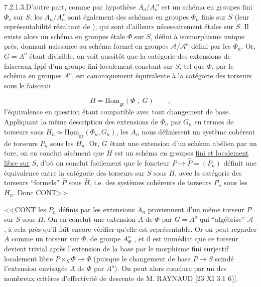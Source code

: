 7.2.1.3.\quad D'autre part, comme par hypothèse $A_{o}/A_{o}^{\;o}$ est un schéma en groupes fini $\Phi_{o}$ sur $S$, les $A_{n}/A_{n}^{\;o}$ sont également des schémas en groupes $\Phi_{n}$ finis sur $S$ (leur représentabilité résultant de \hspace{3cm}), qui sont d'ailleurs nécessairement étales sur $S$. Il existe alors un schéma en groupes étale $\Phi$ sur $S$, défini à isomorphisme unique près, donnant naissance au schéma formel en groupes $\mathcal{A}/\mathcal{A}^{o}$ défini par les $\Phi_{n}$. Or, $G = A^{o}$ étant divisible, on voit aussitôt que la catégorie des extensions de faisceaux fppf d'un groupe fini localement constant sur $S$, tel que $\Phi$, par le schéma en groupes $A^{o}$, est canoniquement équivalente à la catégorie des torseurs sous le faisceau

\begin{equation*}
H = \underline{\mathrm{Hom}}_{\mathrm{gr}}(\Phi \; , \; G) \qquad ,
\end{equation*}
l'équivalence en question étant compatible avec tout changement de base. Appliquant la même description des extensions de $\Phi_{n}$ par $G_{n}$ en termes de torseurs sous $H_{n} \simeq \underline{\mathrm{Hom}}_{\mathrm{gr}}(\Phi_{n},G_{n})$, les $A_{n}$ nous définissent un système cohérent de torseurs $P_{n}$ sous les $H_{n}$. Or, $G$ étant une extension d'un schéma abélien par un tore, on en conclut aisément que $H$ est un schéma en groupes \underline{fini et localement libre sur} $S$, d'où on conclut facilement que le foncteur $P \longmapsto \hat{P} = (P_{n})$ définit une équivalence entre la catégorie des torseurs sur $S$ sous $H$, avec la catégorie des torseurs ``formels'' $\hat{P}$ sous $\hat{H}$, i.e. des systèmes cohérents de torseurs $P_{n}$ sous les $H_{n}$. Donc CONT>>



<<CONT les $P_{n}$ définis par les extensions $A_{n}$ proviennent d'un même torseur $P$ sur $S$ sous $H$. On en conclut une extension $A$ de $\Phi$ par $G = A^{o}$ qui ``algébrise'' $\mathcal{A}$ , à cela près qu'il fait encore vérifier qu'elle est représentable. Or on peut regarder $A$ comme un torseur sur $\Phi$, de groupe $A_{\Phi}^{o}$ , et il est immédiat que ce torseur devient trivial après l'extension de la base par le morphisme fini surjectif localement libre $P \times_{S} \Phi \longrightarrow \Phi$ (puisque le changement de base $P \longrightarrow S$ scindé l'extension envisagée $A$ de $\Phi$ par $A^{o}$). On peut alors conclure par \hspace{1.5cm} un des nombreux critères d'effectivité de descente de M. RAYNAUD [23 XI 3.1 6)].

